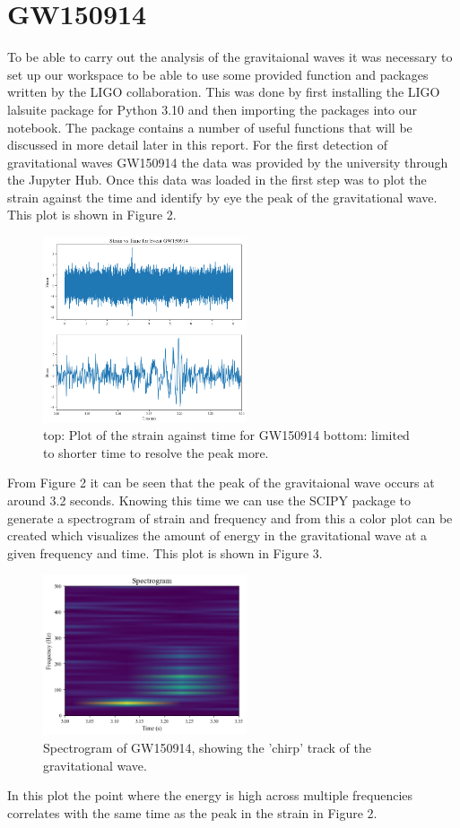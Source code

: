 \documentclass[]{article}
\begin{document}
\section*{GW150914}
To be able to carry out the analysis of the gravitaional waves it was necessary to set
up our workspace to be able to use some provided function and packages written by the
LIGO collaboration. This was done by first installing the LIGO lalsuite package for Python 3.10
and then importing the packages into our notebook. The package contains a number of useful
functions that will be discussed in more detail later in this report.
For the first detection of gravitational waves GW150914 the data was provided
by the university through the Jupyter Hub. Once this data was loaded in
the first step was to plot the strain against the time and identify by eye the peak
of the gravitational wave. This plot is shown in Figure 2.
\begin{figure}
    \includegraphics[width=6cm]{images/Signal_gw150914.png}
    \caption{top: Plot of the strain against time for GW150914 bottom:
    limited to shorter time to resolve the peak more.}
    \label{fig:GW150914}
\end{figure}
\newpage
From Figure 2 it can be seen that the peak of the gravitaional wave occurs at
around 3.2 seconds.
Knowing this time we can use the SCIPY package to generate a spectrogram of strain and frequency and from this a color plot can be
created which visualizes the amount of energy in the gravitational wave at a given
frequency and time. This plot is shown in Figure 3.
\begin{figure}[h]
    \includegraphics[width=6cm]{images/spectrogram_gw150914.png}
    \caption{Spectrogram of GW150914, showing the 'chirp' track of the gravitational wave.}
    \label{fig:spectrogram}
\end{figure}
\newline
In this plot the point where the energy is high across multiple frequencies
correlates with the same time as the peak in the strain in Figure 2.
\end{document}

